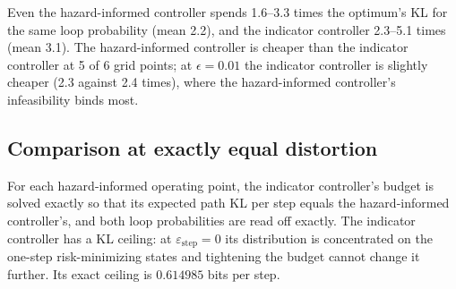 \documentclass[make,article,submit,pdftex]{Definitions/mdpi}
\begin{document}
\begin{table}[H]
\centering
\caption{The event-level optimum and two local controllers (repeat indicator; exact hazard), all matched to the same loop probability $\varepsilon$ within the horizon $H{=}6$. The optimum's achieved $\varepsilon$ matches the target to numerical precision (residual $<10^{-10}$), and the local controllers' to within bisection tolerance ($<10^{-9}$); all are exact, not simulated. KL/step is total path KL divided by $H$, in bits. \textbf{Infeasible}: probability-mass-weighted fraction of steps at which the hazard-informed controller's one-step budget was structurally below its achievable floor.}
\label{tab:oracle}
\end{table}

Even the hazard-informed controller spends 1.6--3.3 times the optimum's KL for the same loop probability (mean 2.2), and the indicator controller 2.3--5.1 times (mean 3.1). The hazard-informed controller is cheaper than the indicator controller at 5 of 6 grid points; at $\epsilon{=}0.01$ the indicator controller is slightly cheaper (2.3 against 2.4 times), where the hazard-informed controller's infeasibility binds most.

\subsection{Comparison at exactly equal distortion}
\label{ssec:equaldist}
For each hazard-informed operating point, the indicator controller's budget is solved exactly so that its expected path KL per step equals the hazard-informed controller's, and both loop probabilities are read off exactly. The indicator controller has a KL ceiling: at $\varepsilon_{\text{step}}{=}0$ its distribution is concentrated on the one-step risk-minimizing states and tightening the budget cannot change it further. Its exact ceiling is $0.614985$ bits per step.
\end{document}
